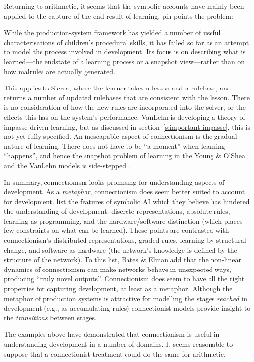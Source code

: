 Returning to arithmetic, it seems that the symbolic accounts have mainly
been applied to the capture of the end-result of learning.
 pin-points the problem:
\begin{ssquote}
While the production-system framework has yielded a number of useful
characterisations of children's procedural skills, it has failed so far as
an attempt to model the process involved in development. Its focus is on
describing what is learned---the endstate of a learning process or a
snapshot view---rather than on how malrules are actually generated.
\end{ssquote}
This applies to Sierra, where the learner takes a lesson and a rulebase,
and returns a number of updated rulebases that are consistent with the
lesson.  There is no consideration of how the new rules are incorporated
into the solver, or the effects this has on the system's performance.
VanLehn is developing a theory of impasse-driven learning, but as
discussed in section~\ref{s:important-impasse}, this
is not
yet fully specified. An
inescapable aspect of connectionism is the gradual nature of learning.
There does not have to be ``a moment'' when learning ``happens'', and hence
the snapshot problem of learning in the Young \& O'Shea and the VanLehn
models is side-stepped \cite[p.~14]{bateconn}.


In summary, connectionism looks promising for understanding aspects of
development. As a {\em metaphor}, connectionism does seem better suited
to account for development.   list the features of symbolic
AI which they believe has hindered the understanding of development:
discrete representations, absolute rules, learning as programming, and the
hardware/software distinction (which places few constraints on what can be
learned).  These points are contrasted with connectionism's distributed
representations, graded rules, learning by structural change, and software
as hardware (the network's knowledge is defined by the structure of the
network). To this list, Bates \& Elman add that the non-linear dynamics
of connectionism can make networks behave in unexpected ways, producing
``truly novel outputs''.  Connectionism does seem to have all the right
properties for capturing development, at least as a metaphor.
Although the metaphor of production systems is
attractive for modelling the stages {\em reached} in development (e.g., as
accumulating rules) connectionist models
provide insight to the {\em transitions} between stages.

The examples above have
demonstrated
that connectionism is useful in understanding development in a number of
domains. It seems reasonable to suppose that a connectionist treatment
could do the same for arithmetic.

